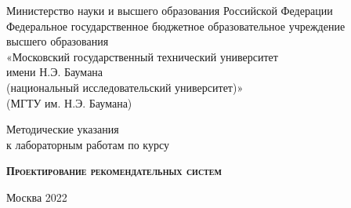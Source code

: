 \begin{titlepage}
	\newpage
	
	\begin{center}
		Министерство науки и высшего образования Российской Федерации \\
		Федеральное государственное бюджетное образовательное учреждение \\ 
		высшего образования \\
		«Московский государственный технический университет \\
		имени Н.Э. Баумана \\
		(национальный исследовательский университет)» \\
		(МГТУ им. Н.Э. Баумана)
		
		\hrulefill
	\end{center}
	
	
	\vspace{10em}
	
	\begin{center}
		\Large Методические указания \\ к лабораторным работам по курсу
	\end{center}
	
	\vspace{2.5em}
	
	\begin{center}
		\textsc{\textbf{Проектирование рекомендательных систем}}
	\end{center}
	
	\vspace{6em}
	
	\vspace{\fill}
	
	\begin{center}
		Москва 2022
	\end{center}
	
\end{titlepage}